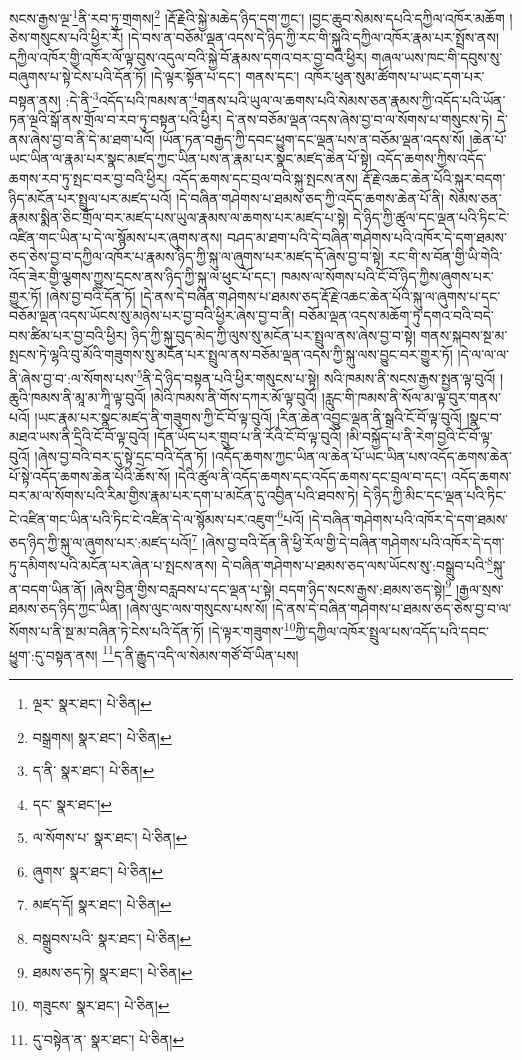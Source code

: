 སངས་རྒྱས་ལྔ་\footnote{ལྔར་  སྣར་ཐང་།  པེ་ཅིན། }ནི་རབ་ཏུ་གྲགས།\footnote{བསྒྲགས།  སྣར་ཐང་།  པེ་ཅིན། } །རྡོ་རྗེའི་སྐྱེ་མཆེད་ཉིད་དག་ཀྱང་། །བྱང་ཆུབ་སེམས་དཔའི་དཀྱིལ་འཁོར་མཆོག །ཅེས་གསུངས་པའི་ཕྱིར་རོ། །དེ་བས་ན་བཅོམ་ལྡན་འདས་དེ་ཉིད་ཀྱི་རང་གི་སྐུའི་དཀྱིལ་འཁོར་རྣམ་པར་སྤྲོས་ནས། དཀྱིལ་འཁོར་གྱི་འཁོར་ལོ་ལྟ་བུས་འདུལ་བའི་སྐྱེ་བོ་རྣམས་དགའ་བར་བྱ་བའི་ཕྱིར། གཞལ་ཡས་ཁང་གི་དབུས་སུ་བཞུགས་པ་སྟེ་ངེས་པའི་དོན་ཏོ། །དེ་ལྟར་སྟོན་པ་དང་། གནས་དང་། འཁོར་ཕུན་སུམ་ཚོགས་པ་ཡང་དག་པར་བསྟན་ནས། :དེ་ནི་\footnote{ད་ནི་  སྣར་ཐང་།  པེ་ཅིན། }འདོད་པའི་ཁམས་ན་\footnote{དང་  སྣར་ཐང་། }གནས་པའི་ཡུལ་ལ་ཆགས་པའི་སེམས་ཅན་རྣམས་ཀྱི་འདོད་པའི་ཡོན་ཏན་ལྔའི་སྒོ་ནས་གྲོལ་བ་རབ་ཏུ་བསྟན་པའི་ཕྱིར། དེ་ནས་བཅོམ་ལྡན་འདས་ཞེས་བྱ་བ་ལ་སོགས་པ་གསུངས་ཏེ། དེ་ནས་ཞེས་བྱ་བ་ནི་དེ་མ་ཐག་པའོ། །ཡོན་ཏན་བརྒྱད་ཀྱི་དབང་ཕྱུག་དང་ལྡན་པས་ན་བཅོམ་ལྡན་འདས་སོ། །ཆེན་པོ་ཡང་ཡིན་ལ་རྣམ་པར་སྣང་མཛད་ཀྱང་ཡིན་པས་ན་རྣམ་པར་སྣང་མཛད་ཆེན་པོ་སྟེ། འདོད་ཆགས་ཀྱིས་འདོད་ཆགས་རབ་ཏུ་སྤང་བར་བྱ་བའི་ཕྱིར། འདོད་ཆགས་དང་བྲལ་བའི་སྐུ་སྤངས་ནས། རྡོ་རྗེ་འཆང་ཆེན་པོའི་སྐུར་བདག་ཉིད་མངོན་པར་སྤྲུལ་པར་མཛད་པའོ། །དེ་བཞིན་གཤེགས་པ་ཐམས་ཅད་ཀྱི་འདོད་ཆགས་ཆེན་པོ་ནི། སེམས་ཅན་རྣམས་སྨིན་ཅིང་གྲོལ་བར་མཛད་པས་ཡུལ་རྣམས་ལ་ཆགས་པར་མཛད་པ་སྟེ། དེ་ཉིད་ཀྱི་ཚུལ་དང་ལྡན་པའི་ཏིང་ངེ་འཛིན་གང་ཡིན་པ་དེ་ལ་སྙོམས་པར་ཞུགས་ནས། བཤད་མ་ཐག་པའི་དེ་བཞིན་གཤེགས་པའི་འཁོར་དེ་དག་ཐམས་ཅད་ཅེས་བྱ་བ་དཀྱིལ་འཁོར་པ་རྣམས་ཉིད་ཀྱི་སྐུ་ལ་ཞུགས་པར་མཛད་དོ་ཞེས་བྱ་བ་སྟེ། རང་གི་ས་བོན་གྱི་ཡི་གེའི་འོད་ཟེར་གྱི་ལྕགས་ཀྱུས་དྲངས་ནས་ཉིད་ཀྱི་སྐུ་ལ་ཕུང་པོ་དང་། ཁམས་ལ་སོགས་པའི་ངོ་བོ་ཉིད་ཀྱིས་ཞུགས་པར་གྱུར་ཏོ། །ཞེས་བྱ་བའི་དོན་ཏོ། །དེ་ནས་དེ་བཞིན་གཤེགས་པ་ཐམས་ཅད་རྡོ་རྗེ་འཆང་ཆེན་པོའི་སྐུ་ལ་ཞུགས་པ་དང་བཅོམ་ལྡན་འདས་ཡོངས་སུ་མཉེས་པར་བྱ་བའི་ཕྱིར་ཞེས་བྱ་བ་ནི། བཅོམ་ལྡན་འདས་མཆོག་ཏུ་དགའ་བའི་བདེ་བས་ཚིམ་པར་བྱ་བའི་ཕྱིར། ཉིད་ཀྱི་སྐུ་བུད་མེད་ཀྱི་ལུས་སུ་མངོན་པར་སྤྲུལ་ནས་ཞེས་བྱ་བ་སྟེ། གནས་སྐབས་སྔ་མ་སྤངས་ཏེ་ལྷའི་བུ་མོའི་གཟུགས་སུ་མངོན་པར་སྤྲུལ་ནས་བཅོམ་ལྡན་འདས་ཀྱི་སྐུ་ལས་བྱུང་བར་གྱུར་ཏོ། །དེ་ལ་ལ་ལ་ནི་ཞེས་བྱ་བ་:ལ་སོགས་པས་\footnote{ལ་སོགས་པ་  སྣར་ཐང་།  པེ་ཅིན། }ནི་དེ་ཉིད་བསྟན་པའི་ཕྱིར་གསུངས་པ་སྟེ། སའི་ཁམས་ནི་སངས་རྒྱས་སྤྱན་ལྟ་བུའོ། །ཆུའི་ཁམས་ནི་མཱ་མ་ཀཱི་ལྟ་བུའོ། །མེའི་ཁམས་ནི་གོས་དཀར་མོ་ལྟ་བུའོ། །རླུང་གི་ཁམས་ནི་སོལ་མ་ལྟ་བུར་གནས་པའོ། །ཡང་རྣམ་པར་སྣང་མཛད་ནི་གཟུགས་ཀྱི་ངོ་བོ་ལྟ་བུའོ། །རིན་ཆེན་འབྱུང་ལྡན་ནི་སྒྲའི་ངོ་བོ་ལྟ་བུའོ། །སྣང་བ་མཐའ་ཡས་ནི་དྲིའི་ངོ་བོ་ལྟ་བུའོ། །དོན་ཡོད་པར་གྲུབ་པ་ནི་རོའི་ངོ་བོ་ལྟ་བུའོ། །མི་བསྐྱོད་པ་ནི་རེག་བྱའི་ངོ་བོ་ལྟ་བུའོ། །ཞེས་བྱ་བའི་བར་དུ་སྟེ་དྲང་བའི་དོན་ཏོ། །འདོད་ཆགས་ཀྱང་ཡིན་ལ་ཆེན་པོ་ཡང་ཡིན་པས་འདོད་ཆགས་ཆེན་པོ་སྟེ་འདོད་ཆགས་ཆེན་པོའི་ཆོས་སོ། །དེའི་ཚུལ་ནི་འདོད་ཆགས་དང་འདོད་ཆགས་དང་བྲལ་བ་དང་། འདོད་ཆགས་བར་མ་ལ་སོགས་པའི་རིམ་གྱིས་རྣམ་པར་དག་པ་མངོན་དུ་འབྱིན་པའི་ཐབས་ཏེ། དེ་ཉིད་ཀྱི་མིང་དང་ལྡན་པའི་ཏིང་ངེ་འཛིན་གང་ཡིན་པའི་ཏིང་ངེ་འཛིན་དེ་ལ་སྙོམས་པར་འཇུག་\footnote{ཞུགས་  སྣར་ཐང་།  པེ་ཅིན། }པའོ། །དེ་བཞིན་གཤེགས་པའི་འཁོར་དེ་དག་ཐམས་ཅད་ཉིད་ཀྱི་སྐུ་ལ་ཞུགས་པར་:མཛད་པའོ།\footnote{མཛད་དོ།  སྣར་ཐང་།  པེ་ཅིན། } །ཞེས་བྱ་བའི་དོན་ནི་ཕྱི་རོལ་གྱི་དེ་བཞིན་གཤེགས་པའི་འཁོར་དེ་དག་ཏུ་དམིགས་པའི་མངོན་པར་ཞེན་པ་སྤངས་ནས། དེ་བཞིན་གཤེགས་པ་ཐམས་ཅད་ལས་ཡོངས་སུ་:བསྒྲུབ་པའི་\footnote{བསྒྲུབས་པའི་  སྣར་ཐང་།  པེ་ཅིན། }སྐུ་ན་བདག་ཡིན་ནོ། །ཞེས་བྱིན་གྱིས་བརླབས་པ་དང་ལྡན་པ་སྟེ། བདག་ཉིད་སངས་རྒྱས་:ཐམས་ཅད་སྟེ།\footnote{ཐམས་ཅད་ཏེ།  སྣར་ཐང་།  པེ་ཅིན། } །རྒྱལ་སྲས་ཐམས་ཅད་ཉིད་ཀྱང་ཡིན། །ཞེས་ལུང་ལས་གསུངས་པས་སོ། །དེ་ནས་དེ་བཞིན་གཤེགས་པ་ཐམས་ཅད་ཅེས་བྱ་བ་ལ་སོགས་པ་ནི་སྔ་མ་བཞིན་ཏེ་ངེས་པའི་དོན་ཏོ། །དེ་ལྟར་གཟུགས་\footnote{གཟུངས་  སྣར་ཐང་།  པེ་ཅིན། }ཀྱི་དཀྱིལ་འཁོར་སྤྲུལ་པས་འདོད་པའི་དབང་ཕྱུག་:དུ་བསྟན་ནས། \footnote{དུ་བསྟེན་ན་  སྣར་ཐང་།  པེ་ཅིན། }ད་ནི་རྒྱུད་འདི་ལ་སེམས་གཙོ་བོ་ཡིན་པས། 